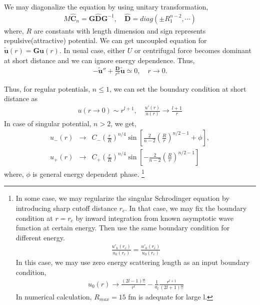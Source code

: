 \documentclass[10pt]{book}
\def\bm{\boldsymbol}
\newcommand{\bea}{\begin{eqnarray}}
\newcommand{\eea}{\end{eqnarray}}
\newcommand{\no}{\nonumber \\}
\begin{document}
We may diagonalize the equation by using unitary transformation,
\bea
M\hat{\bm C}_n={\bm G} \hat{\bm D} {\bm G}^{-1},\quad
\hat{\bm D}=diag(\pm R_1^{n-2},\cdots )
\eea
where, $R$ are constants with length dimension
and sign represents repulsive(attractive) potential.
We can get uncoupled equation for
 $\tilde{\bm u}(r)={\bm G}{\bm u}(r)$.
In usual case, either $U$ or centrifugal force
becomes dominant at short distance and we can ignore
energy dependence. Thus,
\bea
-\tilde{\bm u}''+\frac{\bm D}{r^n}\tilde{\bm u}\simeq 0, \quad r\to 0.
\eea

Thus, for regular potentials, $ n\leq 1$, 
we can set the boundary condition
at short distance as
\bea
u(r\to 0)\sim r^{l+1},\quad \frac{u'(r)}{u(r)}\to \frac{l+1}{r}
\eea
In case of singular potential, $n>2$, we get,
\bea
u_{-}(r)&\to& C_{-}(\frac{r}{R})^{n/4}
  \sin[\frac{2}{n-2}(\frac{R}{r})^{n/2-1}+\phi ],
\no
u_{+}(r)&\to& C_{+}(\frac{r}{R})^{n/4}
  \sin[-\frac{2}{n-2}(\frac{R}{r})^{n/2-1}]
\eea   
where, $\phi$ is general energy dependent phase.
\footnote{
In some case, we may regularize the singular Schrodinger equation
by introducing sharp cutoff distance $r_c$.
In that case, we may fix the boundary condition at $r=r_c$
by inward  integration from 
known asymptotic wave function at certain energy.
Then use the same boundary condition for different energy.
\bea
\frac{u'_k(r_c)}{u_k(r_c)}=\frac{u'_0(r_c)}{u_0(r_c)}
\eea
In this case, we may use zero energy scattering length
as an input boundary condition,
\bea
u_0(r)\to \frac{(2l-1)!!}{r^l}-\frac{1}{a_l}\frac{r^{l+1}}{(2l+1)!!}
\eea 
In numerical calculation, $R_{max}=15$ fm is adequate for large l. 

}
\end{document}
